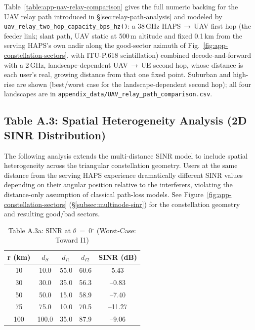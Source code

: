 Table~\ref{table:app-uav-relay-comparison} gives the full numeric backing for
the UAV relay path introduced in \S\ref{sec:relay-path-analysis} and modeled
by \texttt{uav\_relay\_two\_hop\_capacity\_bps\_hz()}: a 38\,GHz
HAPS\,$\rightarrow$\,UAV first hop (the feeder link; slant path, UAV static at
500\,m altitude and fixed 0.1\,km from the serving HAPS's own nadir along the
good-sector azimuth of Fig.~\ref{fig:app-constellation-sectors}, with ITU-P.618
scintillation) combined decode-and-forward with a
2\,GHz, landscape-dependent UAV\,$\rightarrow$\,UE second hop, whose distance is
each user's real, growing distance from that one fixed point. Suburban and
high-rise are shown (best/worst case for the landscape-dependent second hop);
all four landscapes are in \texttt{appendix\_data/UAV\_relay\_path\_comparison.csv}.



\FloatBarrier

\subsection{Table A.3: Spatial Heterogeneity Analysis (2D SINR Distribution)}
\label{sec:app-spatial-sinr}

The following analysis extends the multi-distance SINR model to include spatial heterogeneity across the triangular constellation geometry. Users at the same distance from the serving HAPS experience dramatically different SINR values depending on their angular position relative to the interferers, violating the distance-only assumption of classical path-loss models. See Figure~\ref{fig:app-constellation-sectors} (\S\ref{subsec:multinode-sinr}) for the constellation geometry and resulting good/bad sectors.
\begin{table}[h!]
\centering
\footnotesize
\caption{Table A.3a: SINR at $\theta$~=~0$^\circ$ (Worst-Case: Toward I1)}
\label{table:app-sinr-0deg}
\begin{tabular}{|c|c|c|c|c|}
\hline
\textbf{r (km)} & \textbf{$d_S$} & \textbf{$d_{I1}$} & \textbf{$d_{I2}$} & \textbf{SINR (dB)} \\
\hline
10 & 10.0 & 55.0 & 60.6 & 5.43 \\
30 & 30.0 & 35.0 & 56.3 & --0.83 \\
50 & 50.0 & 15.0 & 58.9 & --7.40 \\
75 & 75.0 & 10.0 & 70.5 & --11.27 \\
100 & 100.0 & 35.0 & 87.9 & --9.06 \\
\hline
\end{tabular}
\end{table}

